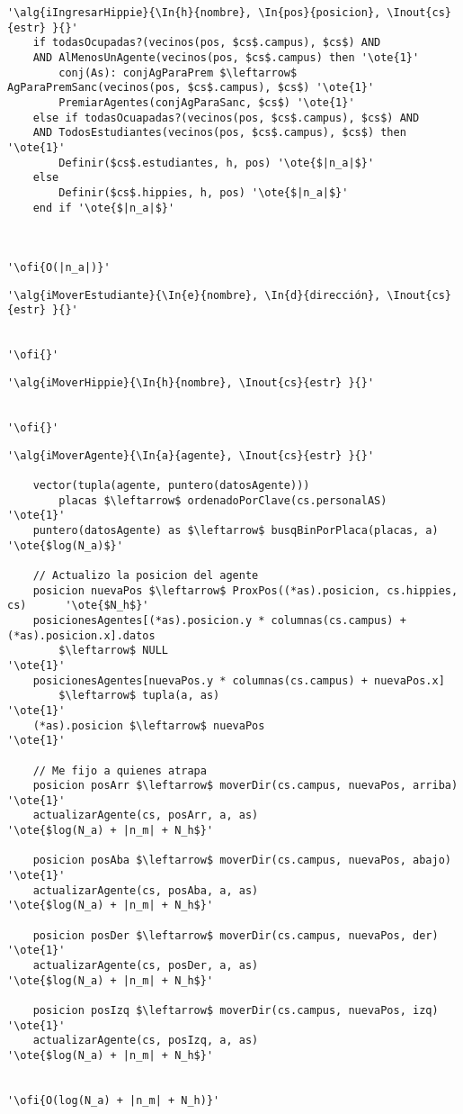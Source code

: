 \begin{lstlisting}[mathescape]
'\alg{iIngresarHippie}{\In{h}{nombre}, \In{pos}{posicion}, \Inout{cs}{estr} }{}'
	if todasOcupadas?(vecinos(pos, $cs$.campus), $cs$) AND 
	AND AlMenosUnAgente(vecinos(pos, $cs$.campus) then '\ote{1}'
		conj(As): conjAgParaPrem $\leftarrow$ AgParaPremSanc(vecinos(pos, $cs$.campus), $cs$) '\ote{1}'
		PremiarAgentes(conjAgParaSanc, $cs$) '\ote{1}'
	else if todasOcuapadas?(vecinos(pos, $cs$.campus), $cs$) AND
	AND TodosEstudiantes(vecinos(pos, $cs$.campus), $cs$) then '\ote{1}'
		Definir($cs$.estudiantes, h, pos) '\ote{$|n_a|$}'
	else
		Definir($cs$.hippies, h, pos) '\ote{$|n_a|$}'
	end if '\ote{$|n_a|$}'

	
	
'\ofi{O(|n_a|)}'
\end{lstlisting}

\begin{lstlisting}[mathescape]
'\alg{iMoverEstudiante}{\In{e}{nombre}, \In{d}{dirección}, \Inout{cs}{estr} }{}'

	
'\ofi{}'
\end{lstlisting}

\begin{lstlisting}[mathescape]
'\alg{iMoverHippie}{\In{h}{nombre}, \Inout{cs}{estr} }{}'

	
'\ofi{}'
\end{lstlisting}

\begin{lstlisting}[mathescape]
'\alg{iMoverAgente}{\In{a}{agente}, \Inout{cs}{estr} }{}'

	vector(tupla(agente, puntero(datosAgente))) 
		placas $\leftarrow$ ordenadoPorClave(cs.personalAS)						'\ote{1}'
	puntero(datosAgente) as $\leftarrow$ busqBinPorPlaca(placas, a)				'\ote{$log(N_a)$}'

	// Actualizo la posicion del agente
	posicion nuevaPos $\leftarrow$ ProxPos((*as).posicion, cs.hippies, cs)		'\ote{$N_h$}'
	posicionesAgentes[(*as).posicion.y * columnas(cs.campus) + (*as).posicion.x].datos 
		$\leftarrow$ NULL														'\ote{1}'
	posicionesAgentes[nuevaPos.y * columnas(cs.campus) + nuevaPos.x] 
		$\leftarrow$ tupla(a, as)												'\ote{1}'
	(*as).posicion $\leftarrow$ nuevaPos										'\ote{1}'

	// Me fijo a quienes atrapa 
	posicion posArr $\leftarrow$ moverDir(cs.campus, nuevaPos, arriba)			'\ote{1}'
	actualizarAgente(cs, posArr, a, as) 				'\ote{$log(N_a) + |n_m| + N_h$}'

	posicion posAba $\leftarrow$ moverDir(cs.campus, nuevaPos, abajo)			'\ote{1}'
	actualizarAgente(cs, posAba, a, as) 				'\ote{$log(N_a) + |n_m| + N_h$}'

	posicion posDer $\leftarrow$ moverDir(cs.campus, nuevaPos, der)				'\ote{1}'
	actualizarAgente(cs, posDer, a, as) 				'\ote{$log(N_a) + |n_m| + N_h$}'

	posicion posIzq $\leftarrow$ moverDir(cs.campus, nuevaPos, izq)				'\ote{1}'
	actualizarAgente(cs, posIzq, a, as) 				'\ote{$log(N_a) + |n_m| + N_h$}'


'\ofi{O(log(N_a) + |n_m| + N_h)}'
\end{lstlisting}

